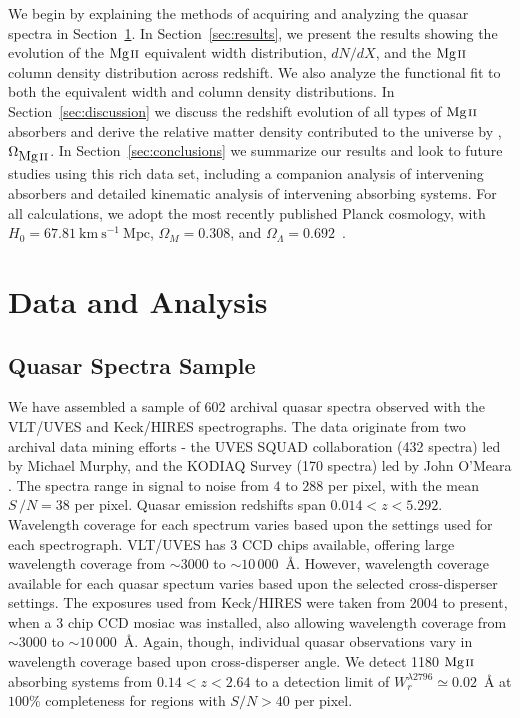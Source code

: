 \documentclass[iop,apj,numberedappendix,appendixfloats,twocolappendix]{emulateapj}
\begin{document}
We begin by explaining the methods of acquiring and analyzing the quasar spectra in Section~\ref{sec:data}. In Section~\ref{sec:results}, we present the results showing the evolution of the ${\hbox{{\rm Mg}\kern 0.1em{\sc ii}}}$ equivalent width distribution, $dN\!/dX$, and the ${\hbox{{\rm Mg}\kern 0.1em{\sc ii}}}$ column density distribution across redshift. We also analyze the functional fit to both the equivalent width and column density distributions. In Section~\ref{sec:discussion} we discuss the redshift evolution of all types of ${\hbox{{\rm Mg}\kern 0.1em{\sc ii}}}$ absorbers and derive the relative matter density contributed to the universe by {\MgII}, $\Omega_{\hbox{{\rm Mg}\kern 0.1em{\sc ii}}}$. In Section~\ref{sec:conclusions} we summarize our results and look to future studies using this rich data set, including a companion analysis of intervening {\CIV} absorbers and detailed kinematic analysis of intervening absorbing systems. For all calculations, we adopt the most recently published Planck cosmology, with $H_0 = 67.81~\mathrm{km~s^{-1}~Mpc}$, $\Omega_M = 0.308$, and $\Omega_{\Lambda} = 0.692$~\citep{Planck2016}.


\section{Data and Analysis}
\label{sec:data}

\subsection{Quasar Spectra Sample}

We have assembled a sample of 602 archival quasar spectra observed with the VLT/UVES and Keck/HIRES spectrographs. The data originate from two archival data mining efforts - the UVES SQUAD collaboration (432 spectra) led by Michael Murphy, and the KODIAQ Survey (170 spectra) led by John O'Meara \citep{OMeara2015}. The spectra range in signal to noise from $4$ to $288$ per pixel, with the mean $S\,/N = 38$ per pixel. Quasar emission redshifts span $0.014 < z < 5.292$. Wavelength coverage for each spectrum varies based upon the settings used for each spectrograph. VLT/UVES has 3 CCD chips available, offering large wavelength coverage from $\sim 3000$ to $\sim10\,000$~{\AA}. However, wavelength coverage available for each quasar spectum varies based upon the selected cross-disperser settings. The exposures used from Keck/HIRES were taken from 2004 to present, when a 3 chip CCD mosiac was installed, also allowing wavelength coverage from  $\sim 3000$ to $\sim10\,000$~{\AA}. Again, though, individual quasar observations vary in wavelength coverage based upon cross-disperser angle. We detect 1180 ${\hbox{{\rm Mg}\kern 0.1em{\sc ii}}}$ absorbing systems from $0.14 < z < 2.64$ to a detection limit of $W_r^{\lambda2796} \simeq 0.02$~{\AA} at $100\%$ completeness for regions with $S/N > 40$ per pixel. 
\end{document}
